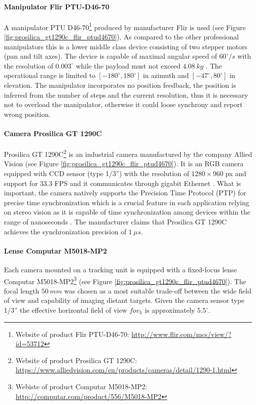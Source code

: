 \paragraph{Manipulator Flir PTU-D46-70} A manipulator PTU D46-70\footnote{Website of product Flir PTU-D46-70: \url{http://www.flir.com/mcs/view/?id=53712}} produced by manufacturer Flir is used (see Figure \ref{fig:prosilica_gt1290c_flir_ptud4670}). As compared to the other professional manipulators this is a lower middle class device consisting of two stepper motors (pan and tilt axes). The device is capable of maximal angular speed of $60^{\circ}/s$ with the resolution of $0.003^{\circ}$ while the payload must not exceed $4.08~kg$ \cite{Flir_ptud4670}. The operational range is limited to $[-180^{\circ}, 180^{\circ}]$ in azimuth and $[-47^{\circ}, 80^{\circ}]$ in elevation. The manipulator incorporates no position feedback, the position is inferred from the number of steps and the current resolution, thus it is necessary not to overload the manipulator, otherwise it could loose synchrony and report wrong position.

\paragraph{Camera Prosilica GT 1290C} Prosilica GT 1290C\footnote{Website of product Prosilica GT 1290C: \url{https://www.alliedvision.com/en/products/cameras/detail/1290-1.html}} is an industrial camera manufactured by the company Allied Vision (see Figure \ref{fig:prosilica_gt1290c_flir_ptud4670}). It is an RGB camera equipped with CCD sensor (type 1/3'') with the resolution of $1280 \times 960$ px and support for $33.3$ FPS and it communicates through gigabit Ethernet \cite{Prosilica_gt1290c}. What is important, the camera natively supports the Precision Time Protocol (PTP) for precise time synchronization which is a crucial feature in each application relying on stereo vision as it is capable of time synchronization among devices within the range of nanoseconds \cite{PTP}. The manufacturer claims that Prosilica GT 1290C achieves the synchronization precision of $1~\mu s$.

\paragraph{Lense Computar M5018-MP2} Each camera mounted on a tracking unit is equipped with a fixed-focus lense Computar M5018-MP2\footnote{Webiste of product Computar M5018-MP2: \url{http://computar.com/product/556/M5018-MP2}} (see Figure \ref{fig:prosilica_gt1290c_flir_ptud4670}). The focal length $50~mm$ was chosen as a most suitable trade-off between the wide field of view and capability of imaging distant targets. Given the camera sensor type 1/3'' the effective horizontal field of view $fov_{h}$ is approximately $5.5^{\circ}$.


